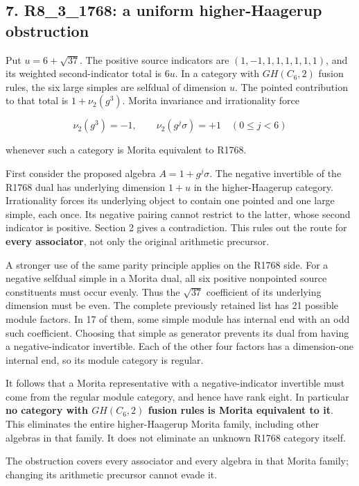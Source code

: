 \documentclass[
  11pt,
]{article}
\begin{document}
\hypertarget{r8_3_1768-a-uniform-higher-haagerup-obstruction}{%
\subsection{7. R8\_3\_1768: a uniform higher-Haagerup
obstruction}\label{r8_3_1768-a-uniform-higher-haagerup-obstruction}}

Put \(u=6+\sqrt{37}\). The positive source indicators are
\((1,-1,1,1,1,1,1,1)\), and its weighted second-indicator total is
\(6u\). In a category with \(GH(C_6,2)\) fusion rules, the six large
simples are selfdual of dimension \(u\). The pointed contribution to
that total is \(1+\nu_2(g^3)\). Morita invariance and irrationality
force

\[
\nu_2(g^3)=-1,\qquad
\nu_2(g^j\sigma)=+1\quad(0\le j<6)
\]

whenever such a category is Morita equivalent to R1768.

First consider the proposed algebra \(A=1+g^j\sigma\). The negative
invertible of the R1768 dual has underlying dimension \(1+u\) in the
higher-Haagerup category. Irrationality forces its underlying object to
contain one pointed and one large simple, each once. Its negative
pairing cannot restrict to the latter, whose second indicator is
positive. Section 2 gives a contradiction. This rules out the route for
\textbf{every associator}, not only the original arithmetic precursor.

A stronger use of the same parity principle applies on the R1768 side.
For a negative selfdual simple in a Morita dual, all six positive
nonpointed source constituents must occur evenly. Thus the \(\sqrt{37}\)
coefficient of its underlying dimension must be even. The complete
previously retained list has 21 possible module factors. In 17 of them,
some simple module has internal end with an odd such coefficient.
Choosing that simple as generator prevents its dual from having a
negative-indicator invertible. Each of the other four factors has a
dimension-one internal end, so its module category is regular.

It follows that a Morita representative with a negative-indicator
invertible must come from the regular module category, and hence have
rank eight. In particular \textbf{no category with \(GH(C_6,2)\) fusion
rules is Morita equivalent to it}. This eliminates the entire
higher-Haagerup Morita family, including other algebras in that family.
It does not eliminate an unknown R1768 category itself.

The obstruction covers every associator and every algebra in that Morita
family; changing its arithmetic precursor cannot evade it.
\end{document}
